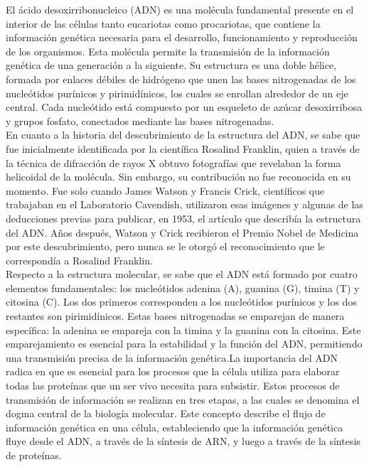 
El ácido desoxirribonucleico (ADN) es una molécula fundamental presente en el interior de las células tanto eucariotas como procariotas, que contiene la información genética necesaria para el desarrollo, funcionamiento y reproducción de los organismos. Esta molécula permite la transmisión de la información genética de una generación a la siguiente. Su estructura es una doble hélice, formada por enlaces débiles de hidrógeno que unen las bases nitrogenadas de los nucleótidos purínicos y pirimidínicos, los cuales se enrollan alrededor de un eje central. Cada nucleótido está compuesto por un esqueleto de azúcar desoxirribosa y grupos fosfato, conectados mediante las bases nitrogenadas.\\

En cuanto a la historia del descubrimiento de la estructura del ADN, se sabe que fue inicialmente identificada por la científica Rosalind Franklin, quien a través de la técnica de difracción de rayos X obtuvo fotografías que revelaban la forma helicoidal de la molécula. Sin embargo, su contribución no fue reconocida en su momento. Fue solo cuando James Watson y Francis Crick, científicos que trabajaban en el Laboratorio Cavendish, utilizaron esas imágenes y algunas de las deducciones previas para publicar, en 1953, el artículo que describía la estructura del ADN. Años después, Watson y Crick recibieron el Premio Nobel de Medicina por este descubrimiento, pero nunca se le otorgó el reconocimiento que le correspondía a Rosalind Franklin.\\

Respecto a la estructura molecular, se sabe que el ADN está formado por cuatro elementos fundamentales: los nucleótidos adenina (A), guanina (G), timina (T) y citosina (C). Los dos primeros corresponden a los nucleótidos purínicos y los dos restantes son pirimidínicos. Estas bases nitrogenadas se emparejan de manera específica: la adenina se empareja con la timina y la guanina con la citosina. Este emparejamiento es esencial para la estabilidad y la función del ADN, permitiendo una transmisión precisa de la información genética.La importancia del ADN radica en que es esencial para los procesos que la célula utiliza para elaborar todas las proteínas que un ser vivo necesita para subsistir. Estos procesos de transmisión de información se realizan en tres etapas, a las cuales se denomina el dogma central de la biología molecular. Este concepto describe el flujo de información genética en una célula, estableciendo que la información genética fluye desde el ADN, a través de la síntesis de ARN, y luego a través de la síntesis de proteínas.\\


